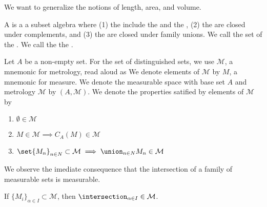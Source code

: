
\sbasic



\sstart



We want to generalize the notions
of length, area, and volume.


A 
is a a subset algebra where
(1) the
include the 
and the ,
(2) the
are closed under complements, and
(3) the
are closed under family unions.
We call the set of
the .
We call the
the .


Let $A$ be a non-empty set.
For the set of distinguished sets, we use
$\mathcal{M}$, a mnemonic for metrology,
read aloud as 
We denote elements of $\mathcal{M}$ by
$M$, a mnemonic for measure.
We denote the measurable space with base
set $A$ and metrology $\mathcal{M}$ by
$(A, \mathcal{M})$.
We denote the properties satified by
elements of $\mathcal{M}$ by

\begin{enumerate}
  \item
  $\emptyset \in \mathcal{M}$

  \item
  $M \in \mathcal{M} \implies
  C_{A}(M) \in \mathcal{M}$

  \item
  $\set{M_n}_{n \in N} \subset
  \mathcal{M} \implies
  \union_{n \in N} M_n \in
  \mathcal{M}$
\end{enumerate}


We observe the imediate consequence that
the intersection of a family of measurable
sets is measurable.

\begin{prop}

If $\{M_i\}_{\alpha \in I}\subset \mathcal{M}$,
then $\intersection_{\alpha \in I} \in \mathcal{M}$.

\end{prop}

\strats
